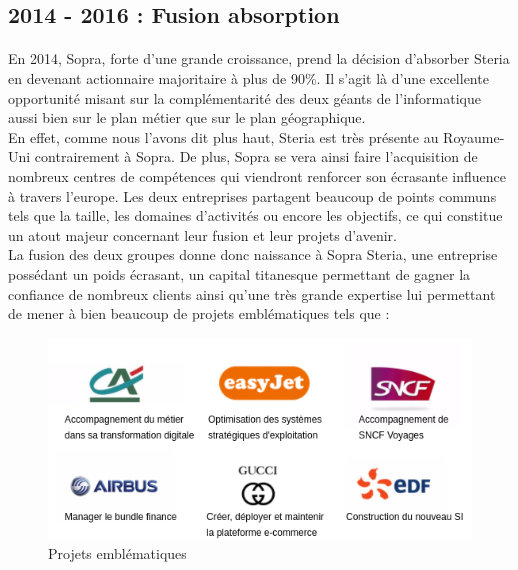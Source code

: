 \subsection{2014 - 2016 : Fusion absorption}

\paragraph{}

En 2014, Sopra, forte d'une grande croissance, prend la décision d'absorber Steria en devenant actionnaire majoritaire à plus de 90\%. Il s'agit là d'une excellente opportunité misant sur la complémentarité des deux géants de l'informatique aussi bien sur le plan métier que sur le plan géographique. \\

En effet, comme nous l'avons dit plus haut, Steria est très présente au Royaume-Uni contrairement à Sopra. De plus, Sopra se vera ainsi faire l'acquisition de nombreux centres de compétences qui viendront renforcer son écrasante influence à travers l'europe. Les deux entreprises partagent beaucoup de points communs tels que la taille, les domaines d'activités ou encore les objectifs, ce qui constitue un atout majeur concernant leur fusion et leur projets d'avenir. \\

La fusion des deux groupes donne donc naissance à Sopra Steria, une entreprise possédant un poids écrasant, un capital titanesque permettant de gagner la confiance de nombreux clients ainsi qu'une très grande expertise lui permettant de mener à bien beaucoup de projets emblématiques tels que : \\

\begin{figure}[h]
	\includegraphics[scale=0.8]{images/projetsEmblematiques.png}
	\centering
	\caption{Projets emblématiques}
	\label{projetsEmblematiques}
\end{figure}
		